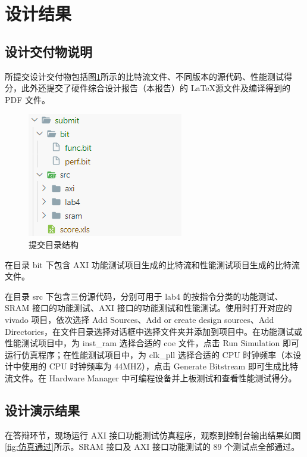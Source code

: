 \section{设计结果}

\subsection{设计交付物说明}

所提交设计交付物包括图\ref{fig:提交目录结构}所示的比特流文件、不同版本的源代码、性能测试得分，此外还提交了硬件综合设计报告（本报告）的 \LaTeX 源文件及编译得到的 PDF 文件。

\begin{figure}[H]
    \centering
    \includegraphics[width=0.5\linewidth]{image/提交目录结构.png}
    \caption{提交目录结构}
    \label{fig:提交目录结构}
\end{figure}

在目录 bit 下包含 AXI 功能测试项目生成的比特流和性能测试项目生成的比特流文件。

在目录 src 下包含三份源代码，分别可用于 lab4 的按指令分类的功能测试、SRAM 接口的功能测试、AXI 接口的功能测试和性能测试。使用时打开对应的 vivado 项目，依次选择 Add Sources、Add or create design sources、Add Directories，在文件目录选择对话框中选择文件夹并添加到项目中。在功能测试或性能测试项目中，为 inst\_ram 选择合适的 coe 文件，点击 Run Simulation 即可运行仿真程序；在性能测试项目中，为 clk\_pll 选择合适的 CPU 时钟频率（本设计中使用的 CPU 时钟频率为 44MHZ），点击 Generate Bitstream 即可生成比特流文件。在 Hardware Manager 中可编程设备并上板测试和查看性能测试得分。

\subsection{设计演示结果}

在答辩环节，现场运行 AXI 接口功能测试仿真程序，观察到控制台输出结果如图\ref{fig:仿真通过}所示。SRAM 接口及 AXI 接口功能测试的 89 个测试点全部通过。

